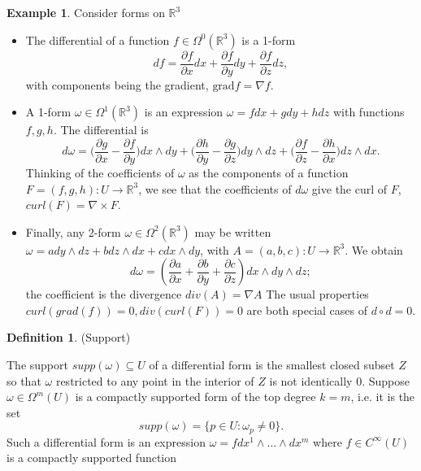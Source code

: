 \documentclass{article}
\theoremstyle{definition}
\newtheorem{defn}[theorem]{Definition}
\newtheorem{example}[theorem]{Example}
\newenvironment{definition}
  {\vspace{8pt}\begin{mdframed}[backgroundcolor=blueish,innertopmargin=4]\begin{defn}}
  {\end{defn}\end{mdframed}\vspace{4pt}}
\begin{document}
\begin{example}
Consider forms on $\mathbb R^3$
\begin{itemize}
    \item The differential of a function $f \in \Omega^0 (\mathbb R^3 )$ is a 1-form 
    \[
        df = \frac{\partial  f}{\partial x} dx + \frac{\partial f}{\partial y}  dy+ \frac{\partial f}{\partial z} dz,
    \]
    with components being the gradient, $\text{grad} f = \nabla f$.
    \item A 1-form $\omega \in \Omega^1 (\mathbb R^3 )$ is an expression $\omega = f dx+gdy+hdz$ with functions $f,g,h$. The differential is 
    \[
        d\omega = \bigg( \frac{\partial g}{\partial x} - \frac{\partial f}{\partial y} \bigg )
        dx \wedge dy +
        \bigg ( \frac{\partial h}{\partial y} - \frac{\partial g}{\partial  z} \bigg)  dy\wedge dz + \bigg(\frac{\partial  f}{\partial  z} - \frac{\partial h}{\partial x} \bigg )  dz\wedge dx.
    \] 
    Thinking of the coefficients of $\omega$ as the components of a function $F = (f,g,h) : U \rightarrow \mathbb R^3 $, we see that the coefficients of $d \omega$ give the curl of $F$, $curl(F) = \nabla \times F$.
    
    \item Finally, any 2-form $\omega \in \Omega^2 (\mathbb R^3 )$ may be written $\omega = a dy \wedge dz + b dz \wedge dx + c dx \wedge dy$, with $A = (a,b, c) : U \rightarrow \mathbb R^3$. We obtain 
    \[
        d\omega = (\frac{\partial a}{\partial x} + \frac{\partial b}{\partial y} + \frac{\partial c}{\partial z}) dx \wedge dy \wedge dz;
    \]
    the coefficient is the divergence $div(A) = \nabla A$ The usual properties $curl(grad(f)) = 0, div(curl(F)) = 0$ are both special cases of $d \circ d = 0$.
    
\end{itemize}
\end{example}

\begin{definition} (Support)

The support $supp(\omega) \subseteq U$ of a differential form is the smallest closed subset $Z$ so that $\omega$ restricted to any point in the interior of $Z$ is not identically 0. Suppose $\omega \in \Omega^m(U)$ is a compactly supported form of the top degree $k = m$, i.e. it is the set
\[
    supp(\omega )= \{p\in U : \omega_p \neq 0 \}.
\]
Such a differential form is an expression $\omega = f dx^1 \wedge \dots \wedge dx^m$ where $f \in C ^\infty(U)$ is a compactly supported function
\end{definition}
\end{document}
